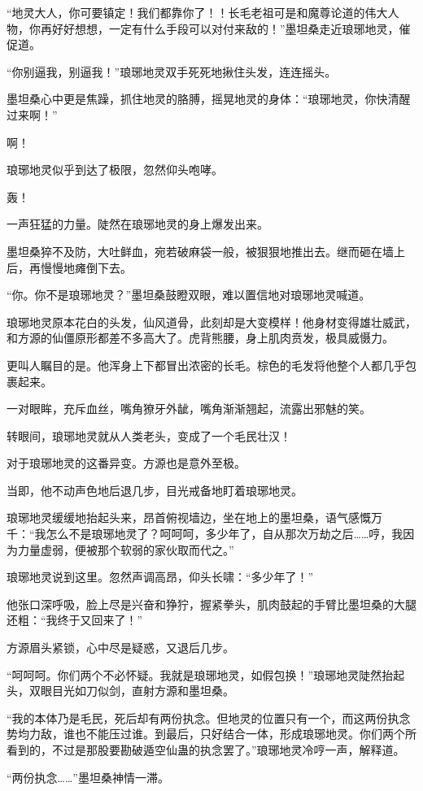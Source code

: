\begin{this_body}
“地灵大人，你可要镇定！我们都靠你了！！长毛老祖可是和魔尊论道的伟大人物，你再好好想想，一定有什么手段可以对付来敌的！”墨坦桑走近琅琊地灵，催促道。

“你别逼我，别逼我！”琅琊地灵双手死死地揪住头发，连连摇头。

墨坦桑心中更是焦躁，抓住地灵的胳膊，摇晃地灵的身体：“琅琊地灵，你快清醒过来啊！”

啊！

琅琊地灵似乎到达了极限，忽然仰头咆哮。

轰！

一声狂猛的力量。陡然在琅琊地灵的身上爆发出来。

墨坦桑猝不及防，大吐鲜血，宛若破麻袋一般，被狠狠地推出去。继而砸在墙上后，再慢慢地瘫倒下去。

“你。你不是琅琊地灵？”墨坦桑鼓瞪双眼，难以置信地对琅琊地灵喊道。

琅琊地灵原本花白的头发，仙风道骨，此刻却是大变模样！他身材变得雄壮威武，和方源的仙僵原形都差不多高大了。虎背熊腰，身上肌肉贲发，极具威慑力。

更叫人瞩目的是。他浑身上下都冒出浓密的长毛。棕色的毛发将他整个人都几乎包裹起来。

一对眼眸，充斥血丝，嘴角獠牙外龇，嘴角渐渐翘起，流露出邪魅的笑。

转眼间，琅琊地灵就从人类老头，变成了一个毛民壮汉！

对于琅琊地灵的这番异变。方源也是意外至极。

当即，他不动声色地后退几步，目光戒备地盯着琅琊地灵。

琅琊地灵缓缓地抬起头来，昂首俯视墙边，坐在地上的墨坦桑，语气感慨万千：“我怎么不是琅琊地灵了？呵呵呵，多少年了，自从那次万劫之后……哼，我因为力量虚弱，便被那个软弱的家伙取而代之。”

琅琊地灵说到这里。忽然声调高昂，仰头长啸：“多少年了！”

他张口深呼吸，脸上尽是兴奋和狰狞，握紧拳头，肌肉鼓起的手臂比墨坦桑的大腿还粗：“我终于又回来了！”

方源眉头紧锁，心中尽是疑惑，又退后几步。

“呵呵呵。你们两个不必怀疑。我就是琅琊地灵，如假包换！”琅琊地灵陡然抬起头，双眼目光如刀似剑，直射方源和墨坦桑。

“我的本体乃是毛民，死后却有两份执念。但地灵的位置只有一个，而这两份执念势均力敌，谁也不能压过谁。到最后，只好结合一体，形成琅琊地灵。你们两个所看到的，不过是那股要勘破遁空仙蛊的执念罢了。”琅琊地灵冷哼一声，解释道。

“两份执念……”墨坦桑神情一滞。


\end{this_body}
